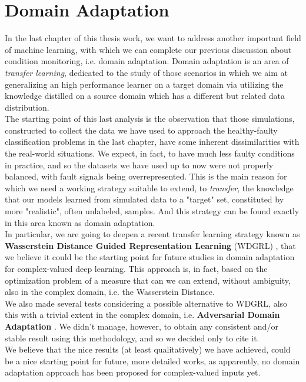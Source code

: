 \documentclass[../main.tex]{subfiles}
\begin{document}
\chapter{Domain Adaptation}
\label{ch:domain_adaptation}

In the last chapter of this thesis work, we want to address another important field of machine learning, with which we can complete our previous discussion about condition monitoring, i.e. domain adaptation. Domain adaptation is an area of \textit{transfer learning}, dedicated to the study of those scenarios in which we aim at generalizing an high performance learner on a target domain via utilizing the knowledge distilled on a source domain which has a different but related data distribution.\\
The starting point of this last analysis is the observation that those simulations, constructed to collect the data we have used to approach the healthy-faulty classification problems in the last chapter, have some inherent dissimilarities with the real-world situations. We expect, in fact, to have much less faulty conditions in practice, and so the datasets we have used up to now were not properly balanced, with fault signals being overrepresented. This is the main reason for which we need a working strategy suitable to extend, to \textit{transfer}, the knowledge that our models learned from simulated data to a "target" set, constituted by more "realistic", often unlabeled, samples. And this strategy can be found exactly in this area known as domain adaptation. \\
In particular, we are going to deepen a recent transfer learning strategy known as \textbf{Wasserstein Distance Guided Representation Learning} (WDGRL) \cite{shen2018wasserstein}, that we believe it could be the starting point for future studies in domain adaptation for complex-valued deep learning. This approach is, in fact, based on the optimization problem of a measure that can we can extend, without ambiguity, also in the complex domain, i.e. the Wasserstein Distance. \\
We also made several tests considering a possible alternative to WDGRL, also this with a trivial extent in the complex domain, i.e. \textbf{Adversarial Domain Adaptation} \cite{adversarial_domain_adaptation, ajakan2015domainadversarial, ganin2016domainadversarial}.
We didn't manage, however, to obtain any consistent and/or stable result using this methodology, and so we decided only to cite it.\\
We believe that the nice results (at least qualitatively) we have achieved, could be a nice starting point for future, more detailed works, as apparently, no domain adaptation approach has been proposed for complex-valued inputs yet.
\end{document}
